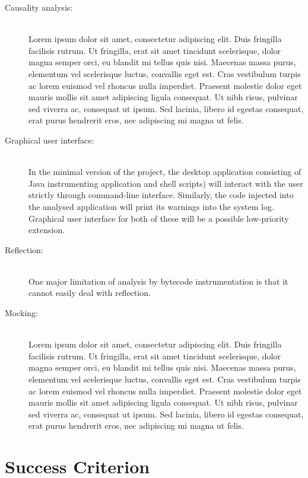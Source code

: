 \documentclass[12pt]{article}
\begin{document}
\begin{description}
\item [Causality analysis:] \ \\
Lorem ipsum dolor sit amet, consectetur adipiscing elit. Duis fringilla facilisis rutrum. Ut fringilla, erat sit amet tincidunt scelerisque, dolor magna semper orci, eu blandit mi tellus quis nisi. Maecenas massa purus, elementum vel scelerisque luctus, convallis eget est. Cras vestibulum turpis ac lorem euismod vel rhoncus nulla imperdiet. Praesent molestie dolor eget mauris mollis sit amet adipiscing ligula consequat. Ut nibh risus, pulvinar sed viverra ac, consequat ut ipsum. Sed lacinia, libero id egestas consequat, erat purus hendrerit eros, nec adipiscing mi magna ut felis.

\item [Graphical user interface:] \ \\
In the minimal version of the project, the desktop application consisting of
Java instrumenting application and shell scripts) will interact with the user
strictly through command-line interface. Similarly, the code injected into 
the analysed application will print its warnings into the system log. 
Graphical user interface for both of these will be a possible low-priority 
extension.

\item [Reflection:] \ \\
One major limitation of analysis by bytecode instrumentation is that it 
cannot easily deal with reflection. 

\item [Mocking:] \ \\
Lorem ipsum dolor sit amet, consectetur adipiscing elit. Duis fringilla facilisis rutrum. Ut fringilla, erat sit amet tincidunt scelerisque, dolor magna semper orci, eu blandit mi tellus quis nisi. Maecenas massa purus, elementum vel scelerisque luctus, convallis eget est. Cras vestibulum turpis ac lorem euismod vel rhoncus nulla imperdiet. Praesent molestie dolor eget mauris mollis sit amet adipiscing ligula consequat. Ut nibh risus, pulvinar sed viverra ac, consequat ut ipsum. Sed lacinia, libero id egestas consequat, erat purus hendrerit eros, nec adipiscing mi magna ut felis.
 
\end{description}





\section*{Success Criterion}
\end{document}
